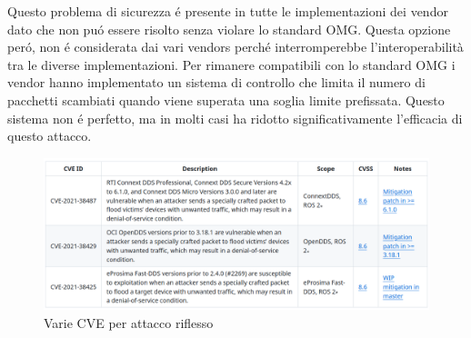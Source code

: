 Questo problema di sicurezza é presente in tutte le implementazioni 
dei vendor dato che non puó essere risolto senza violare lo 
standard OMG. Questa opzione peró, non é considerata dai vari 
vendors perché interromperebbe l'interoperabilità tra le 
diverse implementazioni.
Per rimanere compatibili con lo standard OMG i vendor hanno 
implementato un sistema di controllo che limita il numero 
di pacchetti scambiati quando viene superata una soglia limite
prefissata. Questo sistema non é perfetto, ma in molti casi ha 
ridotto significativamente l'efficacia di questo attacco.

\begin{figure}[H]
    \centering
    \includegraphics[width=15.2cm, keepaspectratio]{img/CVErecoinnassance.png}
    \caption{Varie CVE per attacco riflesso}
    \label{CVErecoinnassance}
\end{figure}
